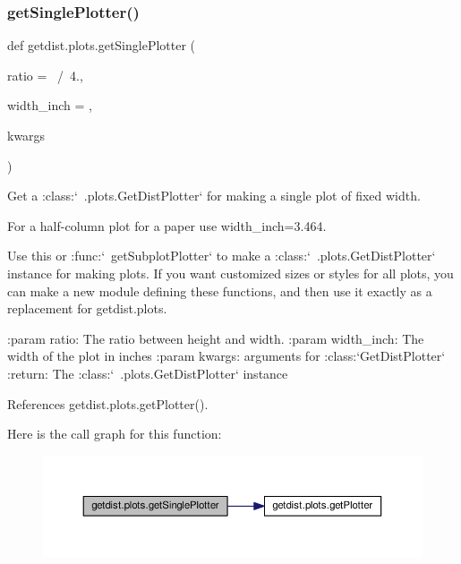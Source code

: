 \subsubsection{\texorpdfstring{get\+Single\+Plotter()}{getSinglePlotter()}}
{\footnotesize\ttfamily def getdist.\+plots.\+get\+Single\+Plotter (\begin{DoxyParamCaption}\item[{}]{ratio = {~/~4.},  }\item[{}]{width\+\_\+inch = {},  }\item[{}]{kwargs }\end{DoxyParamCaption})}

\begin{DoxyVerb}Get a :class:`~.plots.GetDistPlotter` for making a single plot of fixed width. 

For a half-column plot for a paper use width_inch=3.464.

Use this or :func:`~getSubplotPlotter` to make a :class:`~.plots.GetDistPlotter` instance for making plots.
If you want customized sizes or styles for all plots, you can make a new module
defining these functions, and then use it exactly as a replacement for getdist.plots.

:param ratio: The ratio between height and width.
:param width_inch:  The width of the plot in inches
:param kwargs: arguments for :class:`GetDistPlotter`
:return: The :class:`~.plots.GetDistPlotter` instance
\end{DoxyVerb}
 

References getdist.\+plots.\+get\+Plotter().

Here is the call graph for this function\+:
\nopagebreak
\begin{figure}[H]
\begin{center}
\leavevmode
\includegraphics[width=350pt]{namespacegetdist_1_1plots_a3b4916897da068a5f8018c216b631fcf_cgraph}
\end{center}
\end{figure}
\mbox{\label{namespacegetdist_1_1plots_a97e7cbfb3b0571b6c44b8313f8b6cdc9}} 
